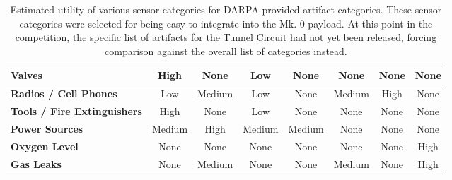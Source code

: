 \begin{table}[]
{\begin{tabular}{lccccccc}
			\textbf{Valves}                     & High                                                          & None                                                              & Low                                                             & None           & None                   & None                                                                         & None                                    \\ \hline
			\textbf{Radios / Cell Phones}       & Low                                                           & Medium                                                            & Low                                                             & None           & Medium                 & High                                                                         & None                                    \\ \hline
			\textbf{Tools / Fire Extinguishers} & High                                                          & None                                                              & Low                                                             & None           & None                   & None                                                                         & None                                    \\ \hline
			\textbf{Power Sources}              & Medium                                                        & High                                                              & Medium                                                          & Medium         & None                   & None                                                                         & None                                    \\ \hline
			\textbf{Oxygen Level}               & None                                                          & None                                                              & None                                                            & None           & None                   & None                                                                         & High                                    \\ \hline
			\textbf{Gas Leaks}                  & None                                                          & Medium                                                            & None                                                            & None           & Medium                 & None                                                                         & High                                    \\ \hline
		\end{tabular}%
	}
	\caption[Estimated sensor utility for artifact detection]{Estimated utility of various sensor categories for DARPA provided artifact categories. These sensor categories were selected for being easy to integrate into the Mk. 0 payload. At this point in the competition, the specific list of artifacts for the Tunnel Circuit had not yet been released, forcing comparison against the overall list of categories instead.}
	\label{sensor_utility_categories}
\end{table}

